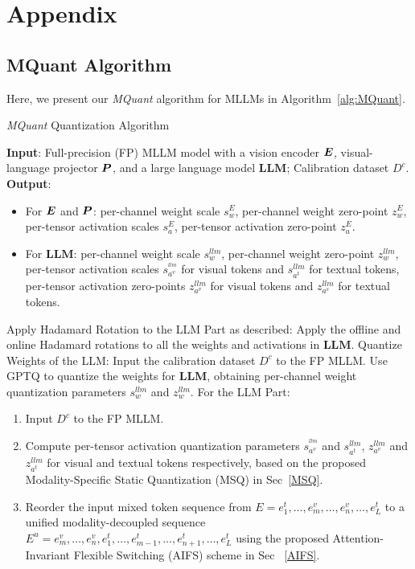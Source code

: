 \clearpage
\onecolumn
\appendix
\section{Appendix}
\label{appendix}
\subsection{MQuant Algorithm}
\label{Mquant}
Here, we present our \emph{MQuant} algorithm for MLLMs in Algorithm~\ref{alg:MQuant}.
\begin{algorithm}[!htb]
\caption{\emph{MQuant} Quantization Algorithm}
\label{alg:MQuant}
\textbf{Input}: Full-precision (FP) MLLM model with a vision encoder $\boldsymbol{E}$, visual-language projector $\boldsymbol{P}$, and a large language model $\textbf{LLM}$; Calibration dataset $D^c$.\\
\textbf{Output}:
\begin{itemize}
\item For $\boldsymbol{E}$ and $\boldsymbol{P}$: per-channel weight scale $s^E_{w}$, per-channel weight zero-point $z^E_{w}$, per-tensor activation scales $s^E_{a}$, per-tensor activation zero-point $z^E_{a}$.
\item For $\textbf{LLM}$: per-channel weight scale $s^{llm}_{w}$, per-channel weight zero-point $z^{llm}_{w}$, per-tensor activation scales $s^{^{llm}}_{a^v}$ for visual tokens and $s^{llm}_{a^t}$ for textual tokens, per-tensor activation zero-points $z^{llm}_{a^v}$ for visual tokens and $z^{llm}_{a^s}$ for textual tokens.
\end{itemize}
\begin{algorithmic}[1]
\STATE Apply Hadamard Rotation to the LLM Part as described:
\STATE Apply the offline and online Hadamard rotations to all the weights and activations in $\textbf{LLM}$.
\STATE Quantize Weights of the LLM:
\STATE Input the calibration dataset $D^c$ to the FP MLLM.
\STATE Use GPTQ to quantize the weights for $\textbf{LLM}$, obtaining per-channel weight quantization parameters $s^{llm}_{w}$ and $z^{llm}_{w}$.
\STATE For the LLM Part:
\begin{enumerate}[label=(\alph*)]
\item Input $D^c$ to the FP MLLM.
\item Compute per-tensor activation quantization parameters $s^{^{llm}}_{a^v}$ and $s^{llm}_{a^t}$, $z^{llm}_{a^v}$ and $z^{llm}_{a^t}$ for visual and textual tokens respectively, based on the proposed Modality-Specific Static Quantization (MSQ) in Sec~\ref{MSQ}.
\item Reorder the input mixed token sequence from $E = {e^t_1, \dots, e^v_m, \dots, e^v_n, \dots, e^t_L}$ to a unified modality-decoupled sequence $E^u = {e^v_m, \dots, e^v_n, e^t_1, \dots, e^t_{m-1}, \dots, e^t_{n+1}, \dots, e^t_L}$ using the proposed Attention-Invariant Flexible Switching (AIFS) scheme in Sec ~\ref{AIFS}.

\end{enumerate}
\end{algorithmic}
\end{algorithm}
